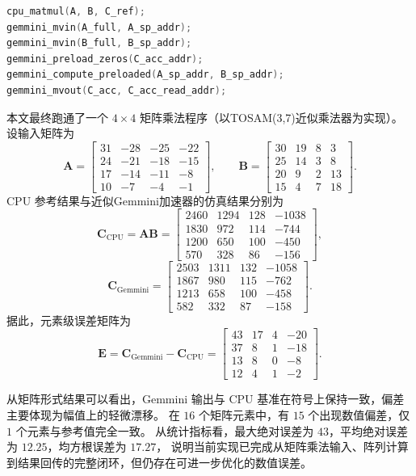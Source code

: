\documentclass[12pt,a4paper,UTF8]{article}
\begin{document}
\begin{lstlisting}[caption={$4\times4$ 裸机矩阵乘法测试的核心调用序列},label={lst:approx-gemmini-c},language=C,basicstyle=\ttfamily\small]
cpu_matmul(A, B, C_ref);
gemmini_mvin(A_full, A_sp_addr);
gemmini_mvin(B_full, B_sp_addr);
gemmini_preload_zeros(C_acc_addr);
gemmini_compute_preloaded(A_sp_addr, B_sp_addr);
gemmini_mvout(C_acc, C_acc_read_addr);
\end{lstlisting}

本文最终跑通了一个 $4\times4$ 矩阵乘法程序（以TOSAM(3,7)近似乘法器为实现）。设输入矩阵为
\[
\mathbf{A}=\begin{bmatrix}
31 & -28 & -25 & -22 \\
24 & -21 & -18 & -15 \\
17 & -14 & -11 & -8 \\
10 & -7 & -4 & -1
\end{bmatrix},\qquad
\mathbf{B}=\begin{bmatrix}
30 & 19 & 8 & 3 \\
25 & 14 & 3 & 8 \\
20 & 9 & 2 & 13 \\
15 & 4 & 7 & 18
\end{bmatrix}.
\]
CPU 参考结果与近似Gemmini加速器的仿真结果分别为
\[
\mathbf{C}_{\mathrm{CPU}}=\mathbf{A}\mathbf{B}=\begin{bmatrix}
2460 & 1294 & 128 & -1038 \\
1830 & 972 & 114 & -744 \\
1200 & 650 & 100 & -450 \\
570 & 328 & 86 & -156
\end{bmatrix},
\]
\[
\mathbf{C}_{\mathrm{Gemmini}}=\begin{bmatrix}
2503 & 1311 & 132 & -1058 \\
1867 & 980 & 115 & -762 \\
1213 & 658 & 100 & -458 \\
582 & 332 & 87 & -158
\end{bmatrix}.
\]
据此，元素级误差矩阵为
\[
\mathbf{E}=\mathbf{C}_{\mathrm{Gemmini}}-\mathbf{C}_{\mathrm{CPU}}=\begin{bmatrix}
43 & 17 & 4 & -20 \\
37 & 8 & 1 & -18 \\
13 & 8 & 0 & -8 \\
12 & 4 & 1 & -2
\end{bmatrix}.
\]

从矩阵形式结果可以看出，Gemmini 输出与 CPU 基准在符号上保持一致，偏差主要体现为幅值上的轻微漂移。
在 $16$ 个矩阵元素中，有 $15$ 个出现数值偏差，仅 $1$ 个元素与参考值完全一致。
从统计指标看，最大绝对误差为 $43$，平均绝对误差为 $12.25$，均方根误差为 $17.27$，
说明当前实现已完成从矩阵乘法输入、阵列计算到结果回传的完整闭环，但仍存在可进一步优化的数值误差。
\end{document}

